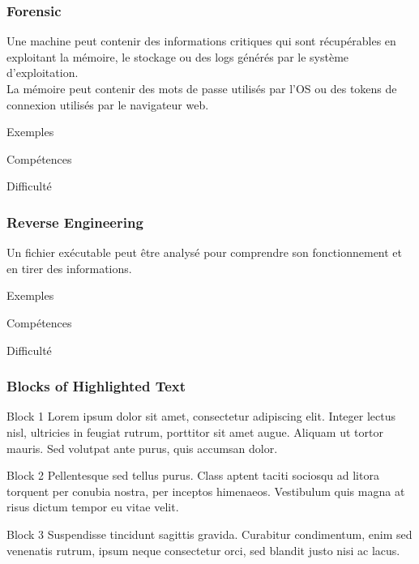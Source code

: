 \documentclass{beamer}
\begin{document}
\begin{frame}
\frametitle{Forensic}

Une machine peut contenir des informations critiques qui sont récupérables en exploitant la mémoire, le stockage ou des logs générés par le système d'exploitation. \\
La mémoire peut contenir des mots de passe utilisés par l'OS ou des tokens de connexion utilisés par le navigateur web.

\begin{block}{Exemples}
\end{block}

\begin{block}{Compétences}
\end{block}

\begin{block}{Difficulté}
\end{block}

\end{frame}


\begin{frame}
\frametitle{Reverse Engineering}

Un fichier exécutable peut être analysé pour comprendre son fonctionnement et en tirer des informations.

\begin{block}{Exemples}
\end{block}

\begin{block}{Compétences}
\end{block}

\begin{block}{Difficulté}
\end{block}

\end{frame}


\begin{frame}
\frametitle{Blocks of Highlighted Text}
\begin{block}{Block 1}
Lorem ipsum dolor sit amet, consectetur adipiscing elit. Integer lectus nisl, ultricies in feugiat rutrum, porttitor sit amet augue. Aliquam ut tortor mauris. Sed volutpat ante purus, quis accumsan dolor.
\end{block}

\begin{block}{Block 2}
Pellentesque sed tellus purus. Class aptent taciti sociosqu ad litora torquent per conubia nostra, per inceptos himenaeos. Vestibulum quis magna at risus dictum tempor eu vitae velit.
\end{block}

\begin{block}{Block 3}
Suspendisse tincidunt sagittis gravida. Curabitur condimentum, enim sed venenatis rutrum, ipsum neque consectetur orci, sed blandit justo nisi ac lacus.
\end{block}
\end{frame}
\end{document}
